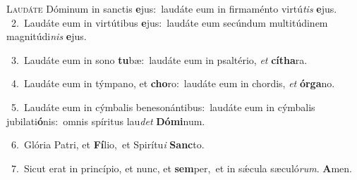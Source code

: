 \lettrine{\initial\textcolor{\initialcolor}{L}}{audáte} Dóminum in sanctis \textbf{e}\-jus:~\star laudáte eum in firmaménto virtú\textit{tis} \textbf{e}\-jus.\\
{\numbfont\textcolor{\numbcolor}{~2.}}~Laudáte eum in virtútibus \textbf{e}\-jus:~\star laudáte eum secúndum multitúdinem magnitúdi\textit{nis} \textbf{e}\-jus.\par
{\numbfont\textcolor{\numbcolor}{~3.}}~Laudáte eum in sono \textbf{tu}\-bæ:~\star laudáte eum in psaltério, \textit{et} \textbf{cí}\-\textbf{tha}ra.\par
{\numbfont\textcolor{\numbcolor}{~4.}}~Laudáte eum in týmpano, et \textbf{cho}\-ro:~\star laudáte eum in chordis, \textit{et} \textbf{ór}\-\textbf{ga}no.\par
{\numbfont\textcolor{\numbcolor}{~5.}}~Laudáte eum in cýmbalis benesonántibus:~\dagger laudáte eum in cýmbalis jubilati\-\textbf{ó}\-nis:~\star omnis spíritus lau\textit{det} \textbf{Dó}\-\textbf{mi}num.\par
{\numbfont\textcolor{\numbcolor}{~6.}}~Glória Patri, et \textbf{Fí}\-lio,~\star et Spirítu\textit{i} \textbf{Sanc}\-to.\par
{\numbfont\textcolor{\numbcolor}{~7.}}~Sicut erat in princípio, et nunc, et \textbf{sem}\-per,~\star et in sǽcula sæculó\-\textit{rum}\-. \textbf{A}\-men.\par

